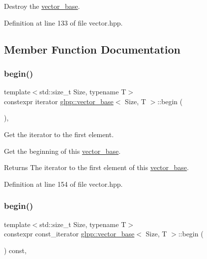 Destroy the \hyperlink{classglpp_1_1vector__base}{vector\+\_\+base}. 



Definition at line 133 of file vector.\+hpp.



\subsection{Member Function Documentation}
\mbox{\label{classglpp_1_1vector__base_af9bf222e1947fe23a560b7e7c8f574a4}} 
\subsubsection{\texorpdfstring{begin()}{begin()}\hspace{0.1cm}{\footnotesize\ttfamily [1/2]}}
{\footnotesize\ttfamily template$<$std\+::size\+\_\+t Size, typename T$>$ \\
constexpr iterator \hyperlink{classglpp_1_1vector__base}{glpp\+::vector\+\_\+base}$<$ Size, T $>$\+::begin (\begin{DoxyParamCaption}{ }\end{DoxyParamCaption})\hspace{0.3cm}{\ttfamily [inline]}, {\ttfamily [noexcept]}}



Get the iterator to the first element. 

Get the beginning of this \hyperlink{classglpp_1_1vector__base}{vector\+\_\+base}.

\begin{DoxyReturn}{Returns}
The iterator to the first element of this \hyperlink{classglpp_1_1vector__base}{vector\+\_\+base}. 
\end{DoxyReturn}


Definition at line 154 of file vector.\+hpp.

\mbox{\label{classglpp_1_1vector__base_aecc2185fb26c757f0ceeadcd256df992}} 
\subsubsection{\texorpdfstring{begin()}{begin()}\hspace{0.1cm}{\footnotesize\ttfamily [2/2]}}
{\footnotesize\ttfamily template$<$std\+::size\+\_\+t Size, typename T$>$ \\
constexpr const\+\_\+iterator \hyperlink{classglpp_1_1vector__base}{glpp\+::vector\+\_\+base}$<$ Size, T $>$\+::begin (\begin{DoxyParamCaption}{ }\end{DoxyParamCaption}) const\hspace{0.3cm}{\ttfamily [inline]}, {\ttfamily [noexcept]}}



